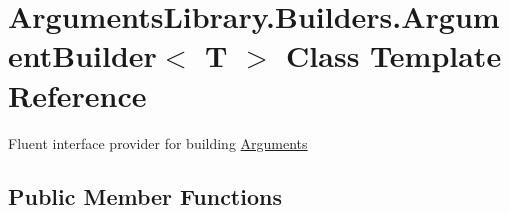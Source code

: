\hypertarget{class_arguments_library_1_1_builders_1_1_argument_builder_3_01_t_01_4}{\section{Arguments\+Library.\+Builders.\+Argument\+Builder$<$ T $>$ Class Template Reference}
\label{class_arguments_library_1_1_builders_1_1_argument_builder_3_01_t_01_4}
}


Fluent interface provider for building \hyperlink{class_arguments_library_1_1_arguments}{Arguments}  


\subsection*{Public Member Functions}
